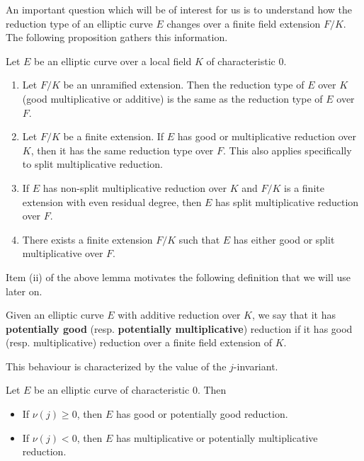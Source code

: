 
An important question which will be of interest for us is to understand how the reduction type of an elliptic curve $E$ changes over a finite field extension $F/K$. The following proposition gathers this information.

\begin{prop}\label{prop_semi_red}
    Let $E$ be an elliptic curve over a local field $K$ of characteristic $0$. 
    \begin{enumerate}[label={(\roman*)}]
        \item Let $F/K$ be an unramified extension. Then the reduction type of $E$ over $K$ (good multiplicative or additive) is the same as the reduction type of $E$ over $F$.
        \item Let $F/K$ be a finite extension. If $E$ has good or multiplicative reduction over $K$, then it has the same reduction type over $F$. This also applies specifically to split multiplicative reduction.
        \item If $E$ has non-split multiplicative reduction over $K$ and $F/K$ is a finite extension with even residual degree, then $E$ has split multiplicative reduction over $F$. 
        \item There exists a finite extension $F/K$ such that $E$ has either good or split multiplicative over $F$.
    \end{enumerate}
\end{prop}

Item (ii) of the above lemma motivates the following definition that we will use later on.

\begin{defn}
Given an elliptic curve $E$ with additive reduction over $K$, we say that it has \textbf{potentially good} (resp. \textbf{potentially multiplicative}) reduction if it has good (resp. multiplicative) reduction over a finite field extension of $K$. 
\end{defn}
This behaviour is characterized by the value of the $j$-invariant.
\begin{prop}\label{prop_j_inv}
    Let $E$ be an elliptic curve of characteristic $0$. Then
    \begin{itemize}
        \item If $\nu(j)\geq0$, then $E$ has good or potentially good reduction.
        \item If $\nu(j)<0$, then $E$ has multiplicative or potentially multiplicative reduction.
    \end{itemize}
\end{prop}


